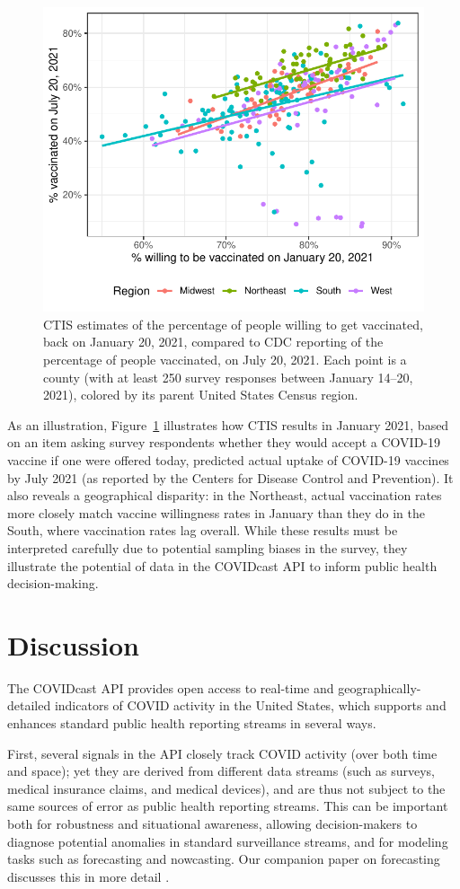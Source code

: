 \documentclass[11pt]{article}
\begin{document}
\begin{figure}
  \centering
  \includegraphics[width=0.6\columnwidth]{fig/vaccine-intent-compare.pdf}
  \caption{CTIS estimates of the percentage of people willing to get
    vaccinated, back on January 20, 2021, compared to CDC reporting of the
    percentage of people vaccinated, on July 20, 2021. Each point is a county
    (with at least 250 survey responses between January 14--20, 2021), colored
    by its parent United States Census region.}
  \label{fig:vaccine-intent-compare}
\end{figure}

As an illustration, Figure~\ref{fig:vaccine-intent-compare} illustrates how CTIS
results in January 2021, based on an item asking survey respondents whether they
would accept a COVID-19 vaccine if one were offered today, predicted actual
uptake of COVID-19 vaccines by July 2021 (as reported by the Centers for Disease
Control and Prevention). It also reveals a geographical disparity: in the
Northeast, actual vaccination rates more closely match vaccine willingness rates
in January than they do in the South, where vaccination rates lag overall. While
these results must be interpreted carefully due to potential sampling biases in
the survey, they illustrate the potential of data in the COVIDcast API to inform
public health decision-making.

\section{Discussion}

The COVIDcast API provides open access to real-time and geographically-detailed
indicators of COVID activity in the United States, which supports and enhances
standard public health reporting streams in several ways.

First, several signals in the API closely track COVID activity (over both time
and space); yet they are derived from different data streams (such as surveys,
medical insurance claims, and medical devices), and are thus not subject to the
same sources of error as public health reporting streams. This can be important
both for robustness and situational awareness, allowing decision-makers to
diagnose potential anomalies in standard surveillance streams, and for modeling
tasks such as forecasting and nowcasting. Our companion paper on forecasting
discusses this in more detail \cite{McDonald:2021}.
\end{document}

